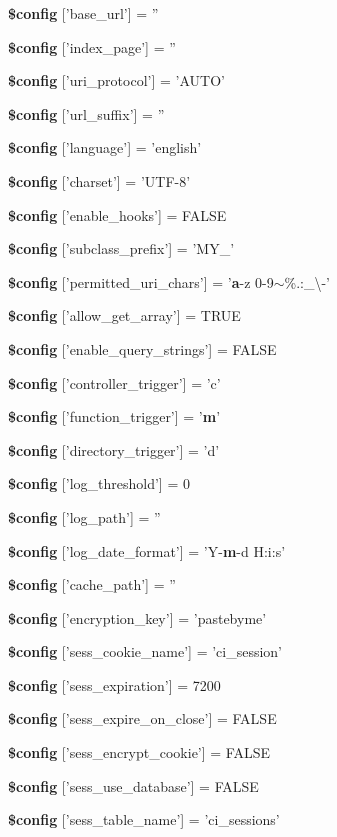 \begin{DoxyCompactItemize}
\item 
{\bf \$config} ['base\-\_\-url'] = ''
\item 
{\bf \$config} ['index\-\_\-page'] = ''
\item 
{\bf \$config} ['uri\-\_\-protocol'] = 'A\-U\-T\-O'
\item 
{\bf \$config} ['url\-\_\-suffix'] = ''
\item 
{\bf \$config} ['language'] = 'english'
\item 
{\bf \$config} ['charset'] = 'U\-T\-F-\/8'
\item 
{\bf \$config} ['enable\-\_\-hooks'] = F\-A\-L\-S\-E
\item 
{\bf \$config} ['subclass\-\_\-prefix'] = 'M\-Y\-\_\-'
\item 
{\bf \$config} ['permitted\-\_\-uri\-\_\-chars'] = '{\bf a}-\/z 0-\/9$\sim$\%.\-:\-\_\-\textbackslash{}-\/'
\item 
{\bf \$config} ['allow\-\_\-get\-\_\-array'] = T\-R\-U\-E
\item 
{\bf \$config} ['enable\-\_\-query\-\_\-strings'] = F\-A\-L\-S\-E
\item 
{\bf \$config} ['controller\-\_\-trigger'] = 'c'
\item 
{\bf \$config} ['function\-\_\-trigger'] = '{\bf m}'
\item 
{\bf \$config} ['directory\-\_\-trigger'] = 'd'
\item 
{\bf \$config} ['log\-\_\-threshold'] = 0
\item 
{\bf \$config} ['log\-\_\-path'] = ''
\item 
{\bf \$config} ['log\-\_\-date\-\_\-format'] = 'Y-\/{\bf m}-\/d H\-:i\-:s'
\item 
{\bf \$config} ['cache\-\_\-path'] = ''
\item 
{\bf \$config} ['encryption\-\_\-key'] = 'pastebyme'
\item 
{\bf \$config} ['sess\-\_\-cookie\-\_\-name'] = 'ci\-\_\-session'
\item 
{\bf \$config} ['sess\-\_\-expiration'] = 7200
\item 
{\bf \$config} ['sess\-\_\-expire\-\_\-on\-\_\-close'] = F\-A\-L\-S\-E
\item 
{\bf \$config} ['sess\-\_\-encrypt\-\_\-cookie'] = F\-A\-L\-S\-E
\item 
{\bf \$config} ['sess\-\_\-use\-\_\-database'] = F\-A\-L\-S\-E
\item 
{\bf \$config} ['sess\-\_\-table\-\_\-name'] = 'ci\-\_\-sessions'

\end{DoxyCompactItemize}
